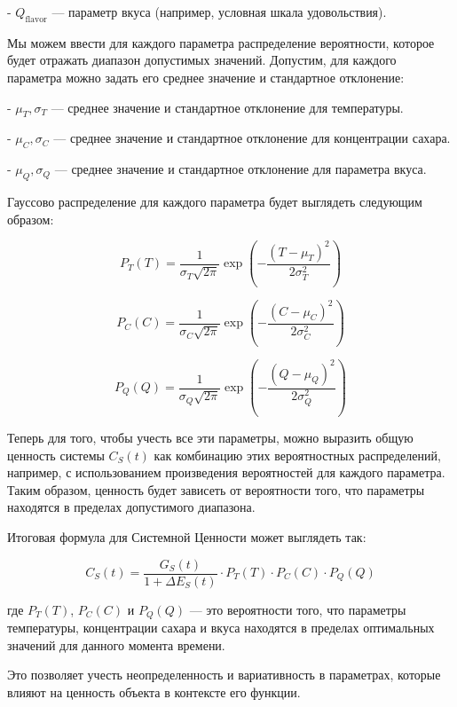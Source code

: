 - \( Q_{\text{flavor}} \) — параметр вкуса (например, условная шкала удовольствия).


Мы можем ввести для каждого параметра распределение вероятности, которое будет отражать диапазон допустимых значений. Допустим, для каждого параметра можно задать его среднее значение и стандартное отклонение:


- \( \mu_T, \sigma_T \) — среднее значение и стандартное отклонение для температуры.

- \( \mu_C, \sigma_C \) — среднее значение и стандартное отклонение для концентрации сахара.

- \( \mu_Q, \sigma_Q \) — среднее значение и стандартное отклонение для параметра вкуса.


Гауссово распределение для каждого параметра будет выглядеть следующим образом:


\[

P_T(T) = \frac{1}{\sigma_T \sqrt{2\pi}} \exp\left(-\frac{(T -\mu_T)^2}{2\sigma_T^2}\right)

\]

\[

P_C(C) = \frac{1}{\sigma_C \sqrt{2\pi}} \exp\left(-\frac{(C -\mu_C)^2}{2\sigma_C^2}\right)

\]

\[

P_Q(Q) = \frac{1}{\sigma_Q \sqrt{2\pi}} \exp\left(-\frac{(Q -\mu_Q)^2}{2\sigma_Q^2}\right)

\]


Теперь для того, чтобы учесть все эти параметры, можно выразить общую ценность системы \( C_S(t) \) как комбинацию этих вероятностных распределений, например, с использованием произведения вероятностей для каждого параметра. Таким образом, ценность будет зависеть от вероятности того, что параметры находятся в пределах допустимого диапазона.


Итоговая формула для Системной Ценности может выглядеть так:


\[

C_S(t) = \frac{G_S(t)}{1 + \Delta E_S(t)} \cdot P_T(T) \cdot P_C(C) \cdot P_Q(Q)

\]


где \( P_T(T) \), \( P_C(C) \) и \( P_Q(Q) \) — это вероятности того, что параметры температуры, концентрации сахара и вкуса находятся в пределах оптимальных значений для данного момента времени.


Это позволяет учесть неопределенность и вариативность в параметрах, которые влияют на ценность объекта в контексте его функции.


